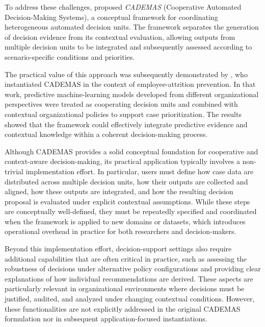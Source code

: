 \documentclass[article,submit,pdftex,moreauthors,mathematics]{Definitions/mdpi}
\begin{document}
To address these challenges, \citet{NovoaHernandez2026} proposed \textit{CADEMAS} (Cooperative Automated Decision-Making Systems), a conceptual framework for coordinating heterogeneous automated decision units. The framework separates the generation of decision evidence from its contextual evaluation, allowing outputs from multiple decision units to be integrated and subsequently assessed according to scenario-specific conditions and priorities.

The practical value of this approach was subsequently demonstrated by \citet{Godz2026}, who instantiated CADEMAS in the context of employee-attrition prevention. In that work, predictive machine-learning models developed from different organizational perspectives were treated as cooperating decision units and combined with contextual organizational policies to support case prioritization. The results showed that the framework could effectively integrate predictive evidence and contextual knowledge within a coherent decision-making process.

Although CADEMAS provides a solid conceptual foundation for cooperative and context-aware decision-making, its practical application typically involves a non-trivial implementation effort. In particular, users must define how case data are distributed across multiple decision units, how their outputs are collected and aligned, how these outputs are integrated, and how the resulting decision proposal is evaluated under explicit contextual assumptions. While these steps are conceptually well-defined, they must be repeatedly specified and coordinated when the framework is applied to new domains or datasets, which introduces operational overhead in practice for both researchers and decision-makers.

Beyond this implementation effort, decision-support settings also require additional capabilities that are often critical in practice, such as assessing the robustness of decisions under alternative policy configurations and providing clear explanations of how individual recommendations are derived. These aspects are particularly relevant in organizational environments where decisions must be justified, audited, and analyzed under changing contextual conditions. However, these functionalities are not explicitly addressed in the original CADEMAS formulation nor in subsequent application-focused instantiations.
\end{document}
